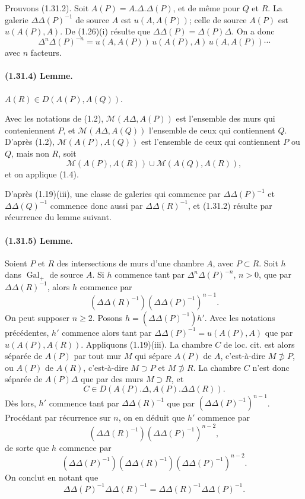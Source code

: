 \documentclass[10pt,a4paper]{article}
\begin{document}
Prouvons (1.31.2). Soit \(A(P)=A.\Delta.\Delta(P)\), et de même pour \(Q\) et \(R\). La galerie \(\Delta\Delta(P)^{-1}\) de source \(A\) est \(u(A,A(P))\); celle de source \(A(P)\) est \(u(A(P),A)\). De (1.26)(i) résulte que \(\Delta\Delta(P)=\Delta(P)\Delta\). On a donc
\[
\tag{1.31.3}
\Delta^n\Delta(P)^{-n}=u(A,A(P))\,u(A(P),A)\,u(A,A(P))\cdots
\]
avec \(n\) facteurs.

\paragraph{(1.31.4) Lemme.} \(A(R)\in D(A(P),A(Q))\).

Avec les notations de (1.2), \(\mathcal M(A\Delta,A(P))\) est l'ensemble des murs qui conteniennent \(P\), et \(\mathcal M(A\Delta,A(Q))\) l'ensemble de ceux qui contiennent \(Q\). D'après (1.2), \(\mathcal M(A(P),A(Q))\) est l'ensemble de ceux qui contiennent \(P\) ou \(Q\), mais non \(R\), soit
\[
\mathcal M(A(P),A(R))\cup \mathcal M(A(Q),A(R)),
\]
et on applique (1.4).

D'après (1.19)(iii), une classe de galeries qui commence par \(\Delta\Delta(P)^{-1}\) et \(\Delta\Delta(Q)^{-1}\) commence donc aussi par \(\Delta\Delta(R)^{-1}\), et (1.31.2) résulte par récurrence du lemme suivant.

\paragraph{(1.31.5) Lemme.} Soient \(P\) et \(R\) des intersections de murs d'une chambre \(A\), avec \(P\subset R\). Soit \(h\) dans \(\operatorname{Gal}_+\) de source \(A\). Si \(h\) commence tant par \(\Delta^n\Delta(P)^{-n}\), \(n>0\), que par \(\Delta\Delta(R)^{-1}\), alors \(h\) commence par
\[
(\Delta\Delta(R)^{-1})(\Delta\Delta(P)^{-1})^{n-1}.
\]
On peut supposer \(n\ge2\). Posons \(h=(\Delta\Delta(P)^{-1})h'\). Avec les notations précédentes, \(h'\) commence alors tant par \(\Delta\Delta(P)^{-1}=u(A(P),A)\) que par \(u(A(P),A(R))\). Appliquons (1.19)(iii). La chambre \(C\) de loc. cit. est alors séparée de \(A(P)\) par tout mur \(M\) qui sépare \(A(P)\) de \(A\), c'est-à-dire \(M\not\supset P\), ou \(A(P)\) de \(A(R)\), c'est-à-dire \(M\supset P\) et \(M\not\supset R\). La chambre \(C\) n'est donc séparée de \(A(P)\Delta\) que par des murs \(M\supset R\), et
\[
C\in D(A(P).\Delta,A(P).\Delta\Delta(R)).
\]
Dès lors, \(h'\) commence tant par \(\Delta\Delta(R)^{-1}\) que par \((\Delta\Delta(P)^{-1})^{n-1}\). Procédant par récurrence sur \(n\), on en déduit que \(h'\) commence par
\[
(\Delta\Delta(R)^{-1})(\Delta\Delta(P)^{-1})^{n-2},
\]
de sorte que \(h\) commence par
\[
(\Delta\Delta(P)^{-1})(\Delta\Delta(R)^{-1})(\Delta\Delta(P)^{-1})^{n-2}.
\]
On conclut en notant que
\[
\Delta\Delta(P)^{-1}\Delta\Delta(R)^{-1}
=\Delta\Delta(R)^{-1}\Delta\Delta(P)^{-1}.
\]
\end{document}
